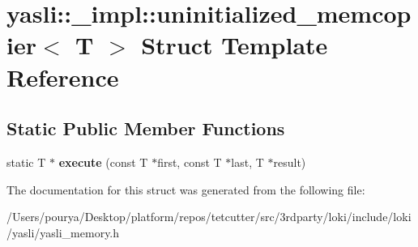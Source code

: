 \hypertarget{structyasli_1_1__impl_1_1uninitialized__memcopier}{}\section{yasli\+:\+:\+\_\+impl\+:\+:uninitialized\+\_\+memcopier$<$ T $>$ Struct Template Reference}
\label{structyasli_1_1__impl_1_1uninitialized__memcopier}
\subsection*{Static Public Member Functions}
\begin{DoxyCompactItemize}
\item 
\hypertarget{structyasli_1_1__impl_1_1uninitialized__memcopier_aedfac3ffb2aaaab88acdb225dff12f57}{}static T $\ast$ {\bfseries execute} (const T $\ast$first, const T $\ast$last, T $\ast$result)\label{structyasli_1_1__impl_1_1uninitialized__memcopier_aedfac3ffb2aaaab88acdb225dff12f57}

\end{DoxyCompactItemize}


The documentation for this struct was generated from the following file\+:\begin{DoxyCompactItemize}
\item 
/\+Users/pourya/\+Desktop/platform/repos/tetcutter/src/3rdparty/loki/include/loki/yasli/yasli\+\_\+memory.\+h\end{DoxyCompactItemize}
